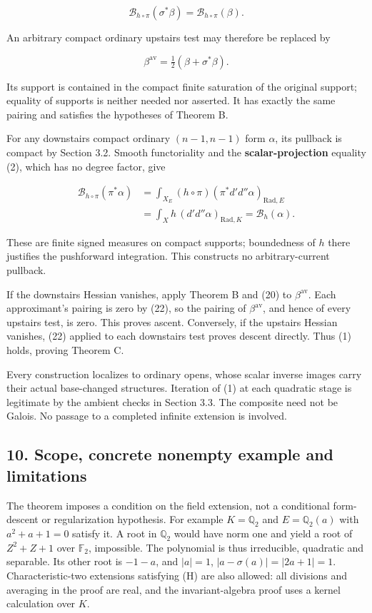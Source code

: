 \documentclass[
  11pt,
]{article}
\begin{document}
\[\mathcal B_{h\circ\pi}(\sigma^*\beta)=\mathcal B_{h\circ\pi}(\beta).\]

An arbitrary compact ordinary upstairs test may therefore be replaced by

\[\beta^{\mathrm{av}}=\tfrac12(\beta+\sigma^*\beta).\]

Its support is contained in the compact finite saturation of the
original support; equality of supports is neither needed nor asserted.
It has exactly the same pairing and satisfies the hypotheses of Theorem
B.

For any downstairs compact ordinary \((n-1,n-1)\) form \(\alpha\), its
pullback is compact by Section 3.2. Smooth functoriality and the
\textbf{scalar-projection} equality (2), which has no degree factor,
give

\[
\begin{aligned}
\mathcal B_{h\circ\pi}(\pi^*\alpha)
&=\int_{X_E}(h\circ\pi)(\pi^*d'd''\alpha)_{\mathrm{Rad},E}\\
&=\int_X h\,(d'd''\alpha)_{\mathrm{Rad},K}
=\mathcal B_h(\alpha).
\end{aligned} \tag{22}
\]

These are finite signed measures on compact supports; boundedness of
\(h\) there justifies the pushforward integration. This constructs no
arbitrary-current pullback.

If the downstairs Hessian vanishes, apply Theorem B and (20) to
\(\beta^{\mathrm{av}}\). Each approximant's pairing is zero by (22), so
the pairing of \(\beta^{\mathrm{av}}\), and hence of every upstairs
test, is zero. This proves ascent. Conversely, if the upstairs Hessian
vanishes, (22) applied to each downstairs test proves descent directly.
Thus (1) holds, proving Theorem C.

Every construction localizes to ordinary opens, whose scalar inverse
images carry their actual base-changed structures. Iteration of (1) at
each quadratic stage is legitimate by the ambient checks in Section 3.3.
The composite need not be Galois. No passage to a completed infinite
extension is involved.

\subsection{10. Scope, concrete nonempty example and
limitations}\label{scope-concrete-nonempty-example-and-limitations}

The theorem imposes a condition on the field extension, not a
conditional form-descent or regularization hypothesis. For example
\(K=\mathbb Q_2\) and \(E=\mathbb Q_2(a)\) with \(a^2+a+1=0\) satisfy
it. A root in \(\mathbb Q_2\) would have norm one and yield a root of
\(Z^2+Z+1\) over \(\mathbb F_2\), impossible. The polynomial is thus
irreducible, quadratic and separable. Its other root is \(-1-a\), and
\(|a|=1\), \(|a-\sigma(a)|=|2a+1|=1\). Characteristic-two extensions
satisfying (H) are also allowed: all divisions and averaging in the
proof are real, and the invariant-algebra proof uses a kernel
calculation over \(K\).
\end{document}
